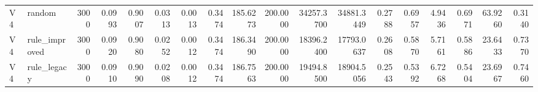 \begin{table}
\begin{tabular}{llrrrrrrrrrrrrrrrr}
V4 & random & 3000 & 0.0993 & 0.9007 & 0.0313 & 0.0013 & 0.3474 & 185.6273 & 200.0000 & 34257.3700 & 34881.3449 & 0.2788 & 0.6957 & 4.9436 & 0.6971 & 63.9260 & 0.3140 \\
V4 & rule\_improved & 3000 & 0.0920 & 0.9080 & 0.0252 & 0.0012 & 0.3474 & 186.3490 & 200.0000 & 18396.2400 & 17793.0637 & 0.2608 & 0.5870 & 5.7161 & 0.5886 & 23.6433 & 0.7370 \\
V4 & rule\_legacy & 3000 & 0.0910 & 0.9090 & 0.0208 & 0.0012 & 0.3474 & 186.7563 & 200.0000 & 19494.8500 & 18904.5056 & 0.2543 & 0.5392 & 6.7268 & 0.5404 & 23.6967 & 0.7460 \\
\bottomrule
\end{tabular}
\end{table}
